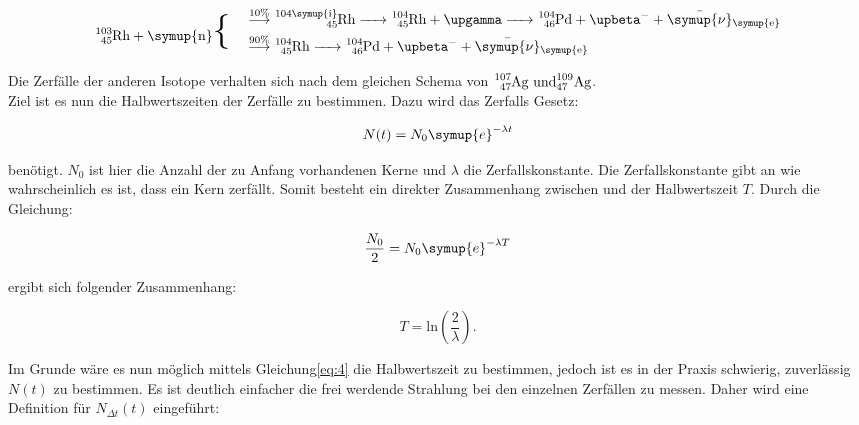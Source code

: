 \begin{equation}
   \begin{split}
      \ce{^{103}_{45}\text{Rh} + \symup{n}} \mathbin{\scalebox{2.5} \textbraceleft } \quad
   \end{split}
   \begin{split}
      &\overset{10\%}{\longrightarrow} \ce{^{104\symup{i}}_{45}\text{Rh} -> ^{104}_{45}\text{Rh} + $\upgamma$ -> ^{104}_{46}\text{Pd} + $\upbeta$^- + \bar{\symup{\nu}}_{\symup{e}} } \\
      &\overset{90\%}{\longrightarrow} \ce{^{104}_{45}\text{Rh} -> ^{104}_{46}\text{Pd} + $\upbeta$^- +\bar{\symup{\nu}}_{\symup{e}} } \\
   \end{split}
   \label{eq:Rh103}
\end{equation}

\noindent Die Zerfälle der anderen Isotope verhalten sich nach dem gleichen Schema von $\ce{^{107}_{47}\text{Ag und}^{109}_{47}\text{Ag}}$.\\
Ziel ist es nun die Halbwertszeiten der Zerfälle zu bestimmen. Dazu wird das Zerfalls Gesetz:

\begin{equation}
   N(t) = N_0 \symup{e}^{- \lambda t} 
   \label{eq:4}
\end{equation}

\noindent benötigt. $N_0$ ist hier die Anzahl der zu Anfang vorhandenen Kerne und $\lambda$ die Zerfallskonstante. Die Zerfallskonstante gibt an 
wie wahrscheinlich es ist, dass ein Kern zerfällt. Somit besteht ein direkter Zusammenhang zwischen \lambda und der Halbwertszeit $T$.
Durch die Gleichung:

\begin{equation*}
   \frac{N_0}{2} = N_0 \symup{e}^{- \lambda T} 
\end{equation*}

\noindent ergibt sich folgender Zusammenhang:

\begin{equation*}
   T = \text{ln}\left(\frac{2}{\lambda}\right) . \nonumber
\end{equation*}

\noindent Im Grunde wäre es nun möglich mittels Gleichung\ref{eq:4} die Halbwertszeit zu bestimmen, jedoch ist es in der Praxis schwierig, 
zuverlässig $N(t)$ zu bestimmen. Es ist deutlich einfacher die frei werdende Strahlung bei den einzelnen Zerfällen zu messen.
Daher wird eine Definition für $N_{\Delta t}(t)$ eingeführt:

